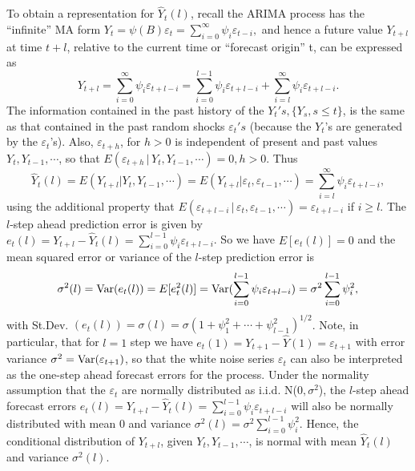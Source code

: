 To obtain a representation for $\hat{Y}_t(l)$, recall the ARIMA process has the ``infinite'' MA form $Y_t = \psi(B)\varepsilon_t = \sum_{i=0}^{\infty}\psi_i\varepsilon_{t-i},$ and hence a future value $Y_{t+l}$ at time $t+l$, relative to the current time or ``forecast origin'' t, can be expressed as
	\begin{equation}\label{eqn:2ytl}
	Y_{t+l} = \sum_{i=0}^\infty\psi_i\varepsilon_{t+l-i} = \sum_{i=0}^{l-1}\psi_i\varepsilon_{t+l-i} + \sum_{i=l}^\infty\psi_i\varepsilon_{t+l-i}.
	\end{equation}
The information contained in the past history of the $Y_t's, \{Y_s, s \leq t\}$, is the same as that contained in the past random shocks $\varepsilon_t's$ (because the $Y_t$'s are generated by the $\varepsilon_t$'s). Also, $\varepsilon_{t+h}$, for $h > 0$ is independent of present and past values $Y_{t},Y_{t-1},\cdots$, so that $E(\varepsilon_{t+h}\,|\,Y_t,Y_{t-1},\cdots) = 0, h>0$. Thus
	\begin{equation}\label{eqn:2yhatt}
	\hat{Y}_t(l) = E(Y_{t+l}|Y_t,Y_{t-1},\cdots) = E(Y_{t+l}|\varepsilon_t,\varepsilon_{t-1},\cdots) = \sum_{i=l}^\infty\psi_i\varepsilon_{t+l-i},
	\end{equation}
using the additional property that $E(\varepsilon_{t+l-i}\,|\,\varepsilon_t,\varepsilon_{t-1},\cdots) = \varepsilon_{t+l-i}$ if $i \geq l$. The $l$-step ahead prediction error is given by $e_t(l) = Y_{t+l} - \hat{Y}_t(l) = \sum_{i=0}^{l-1}\psi_i\varepsilon_{t+l-i}$. So we have $E[e_t(l)]=0$ and the mean squared error or variance of the $l$-step prediction error is
	\begin{equation}\label{eqn:2sigmasq}
\sigma^2(l) = \Var(e_t(l)) = E[e_t^2(l)] = \Var(\sum_{i=0}^{l-1}\psi_i\varepsilon_{t+l-i}) = \sigma^2\sum_{i=0}^{l-1}\psi_i^2,
	\end{equation}
with St.Dev. $(e_t(l)) = \sigma(l) = \sigma(1 + \psi_1^2 + \cdots + \psi_{l-1}^2)^{1/2}$. Note, in particular, that for $l = 1$ step we have $e_t(1) = Y_{t+1} - \hat{Y}(1) = \varepsilon_{t+1}$ with error variance $\sigma^2 = \operatorname{Var}(\varepsilon_{t+1})$, so that the white noise series $\varepsilon_t$ can also be interpreted as the one-step ahead forecast errors for the process. Under the normality assumption that the $\varepsilon_t$ are normally distributed as i.i.d. N($0, \sigma^2$), the $l$-step ahead forecast errors $e_t(l) = Y_{t+l} - \hat{Y}_t(l) = \sum_{i=0}^{l-1}\psi_i\varepsilon_{t+l-i}$ will also be normally distributed with mean 0 and variance $\sigma^2(l) = \sigma^2\sum_{i=0}^{l-1}\psi_i^2$. Hence, the conditional distribution of $Y_{t+l}$, given $Y_t,Y_{t-1},\cdots$, is normal with mean $\hat{Y}_t(l)$ and variance $\sigma^2(l)$.



